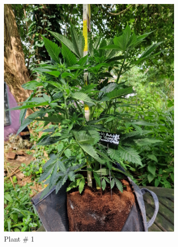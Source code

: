 \begin{figure}[htbp]
    \begin{subfigure}[t]{.28\textwidth}
        \includegraphics[width=\linewidth]{plant_01_2024-06-17}
        \caption{Plant \# 1}
        \label{fig:plant_01_2024-06-17}
    \end{subfigure}
    \begin{subfigure}[t]{.28\textwidth}

\end{subfigure}
\end{figure}
